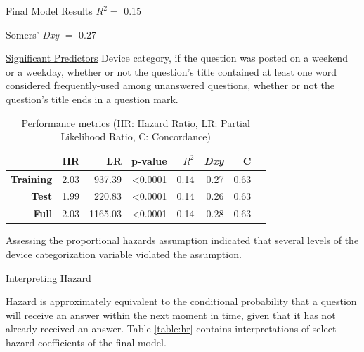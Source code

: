 \documentclass[final]{beamer}
\newlength{\onecolwid}
\newlength{\twocolwid}
\begin{document}
\begin{frame}[t]
\begin{columns}[t]
\begin{column}{\twocolwid}
\begin{columns}[t,totalwidth=\twocolwid]
\begin{column}{\onecolwid}
\begin{block}{Final Model Results}
\textcolor{dblue!70}{} $R^2 =$ 0.15

\textcolor{dblue!70}{} Somers' \textit{Dxy} $=$ 0.27 

\underline{Significant Predictors} Device category, if the question was posted on a weekend or a weekday, whether or not the question's title contained at least one word considered frequently-used among unanswered questions, whether or not the question's title ends in a question mark.

\begin{table}[!htbp]
\vspace{3ex}
\begin{tabular}{|r|r|r|r|r|r|r|r|} %
  \hline
  & \textbf{HR} & \textbf{LR} & \textbf{p-value} & \textbf{$R^2$} & \textbf{\textit{Dxy}} & \textbf{C} \\ 
  \hline
  \textbf{Training} & 2.03 & 937.39  & \textless0.0001 & 0.14 & 0.27 & 0.63 \\ 
  \textbf{Test}     & 1.99 & 220.83  & \textless0.0001 & 0.14 & 0.26 & 0.63 \\
  \textbf{Full}     & 2.03 & 1165.03 & \textless0.0001 & 0.14 & 0.28 & 0.63 \\ 
  \hline
\end{tabular}
\caption{Performance metrics (HR: Hazard Ratio, LR: Partial Likelihood Ratio, C: Concordance)} 
\label{table:1}
\end{table}

Assessing the proportional hazards assumption indicated that several levels of the device categorization variable violated the assumption. 

\end{block}


\begin{block}{Interpreting Hazard}

Hazard is approximately equivalent to the conditional probability that a question will receive an answer within the next moment in time, given that it has not already received an answer. Table \ref{table:hr} contains interpretations of select hazard coefficients of the final model.

\end{block}



\end{column}
\end{columns}
\end{column}
\end{columns}
\end{frame}
\end{document}
